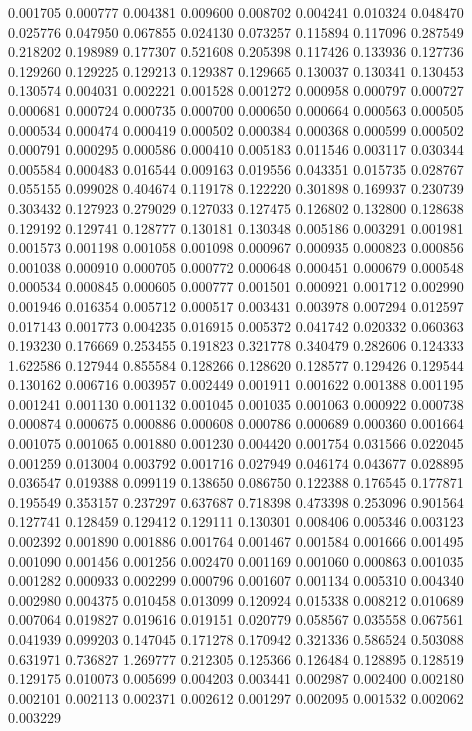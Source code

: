 0.001705
0.000777
0.004381
0.009600
0.008702
0.004241
0.010324
0.048470
0.025776
0.047950
0.067855
0.024130
0.073257
0.115894
0.117096
0.287549
0.218202
0.198989
0.177307
0.521608
0.205398
0.117426
0.133936
0.127736
0.129260
0.129225
0.129213
0.129387
0.129665
0.130037
0.130341
0.130453
0.130574
0.004031
0.002221
0.001528
0.001272
0.000958
0.000797
0.000727
0.000681
0.000724
0.000735
0.000700
0.000650
0.000664
0.000563
0.000505
0.000534
0.000474
0.000419
0.000502
0.000384
0.000368
0.000599
0.000502
0.000791
0.000295
0.000586
0.000410
0.005183
0.011546
0.003117
0.030344
0.005584
0.000483
0.016544
0.009163
0.019556
0.043351
0.015735
0.028767
0.055155
0.099028
0.404674
0.119178
0.122220
0.301898
0.169937
0.230739
0.303432
0.127923
0.279029
0.127033
0.127475
0.126802
0.132800
0.128638
0.129192
0.129741
0.128777
0.130181
0.130348
0.005186
0.003291
0.001981
0.001573
0.001198
0.001058
0.001098
0.000967
0.000935
0.000823
0.000856
0.001038
0.000910
0.000705
0.000772
0.000648
0.000451
0.000679
0.000548
0.000534
0.000845
0.000605
0.000777
0.001501
0.000921
0.001712
0.002990
0.001946
0.016354
0.005712
0.000517
0.003431
0.003978
0.007294
0.012597
0.017143
0.001773
0.004235
0.016915
0.005372
0.041742
0.020332
0.060363
0.193230
0.176669
0.253455
0.191823
0.321778
0.340479
0.282606
0.124333
1.622586
0.127944
0.855584
0.128266
0.128620
0.128577
0.129426
0.129544
0.130162
0.006716
0.003957
0.002449
0.001911
0.001622
0.001388
0.001195
0.001241
0.001130
0.001132
0.001045
0.001035
0.001063
0.000922
0.000738
0.000874
0.000675
0.000886
0.000608
0.000786
0.000689
0.000360
0.001664
0.001075
0.001065
0.001880
0.001230
0.004420
0.001754
0.031566
0.022045
0.001259
0.013004
0.003792
0.001716
0.027949
0.046174
0.043677
0.028895
0.036547
0.019388
0.099119
0.138650
0.086750
0.122388
0.176545
0.177871
0.195549
0.353157
0.237297
0.637687
0.718398
0.473398
0.253096
0.901564
0.127741
0.128459
0.129412
0.129111
0.130301
0.008406
0.005346
0.003123
0.002392
0.001890
0.001886
0.001764
0.001467
0.001584
0.001666
0.001495
0.001090
0.001456
0.001256
0.002470
0.001169
0.001060
0.000863
0.001035
0.001282
0.000933
0.002299
0.000796
0.001607
0.001134
0.005310
0.004340
0.002980
0.004375
0.010458
0.013099
0.120924
0.015338
0.008212
0.010689
0.007064
0.019827
0.019616
0.019151
0.020779
0.058567
0.035558
0.067561
0.041939
0.099203
0.147045
0.171278
0.170942
0.321336
0.586524
0.503088
0.631971
0.736827
1.269777
0.212305
0.125366
0.126484
0.128895
0.128519
0.129175
0.010073
0.005699
0.004203
0.003441
0.002987
0.002400
0.002180
0.002101
0.002113
0.002371
0.002612
0.001297
0.002095
0.001532
0.002062
0.003229
